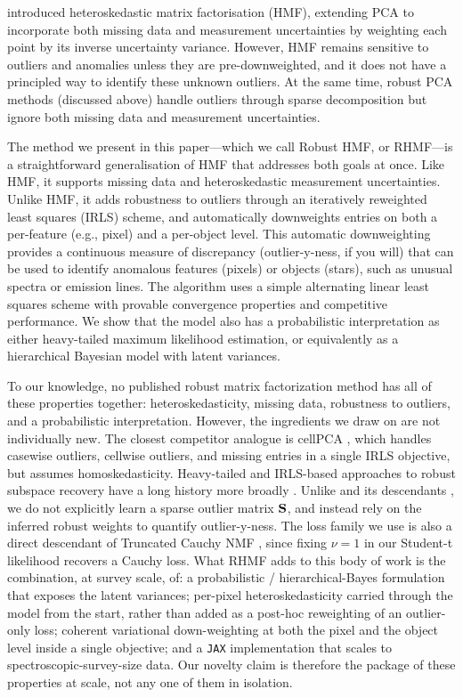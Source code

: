 \documentclass[onecolumn,floatfix,linenumbers,trackchanges]{aastex631}
\begin{document}
\citet{tsalmantza2012} introduced heteroskedastic matrix factorisation (HMF), extending PCA to incorporate both missing data and measurement uncertainties by weighting each point by its inverse uncertainty variance. However, HMF remains sensitive to outliers and anomalies unless they are pre-downweighted, and it does not have a principled way to identify these unknown outliers. At the same time, robust PCA methods (discussed above) handle outliers through sparse decomposition but ignore both missing data and measurement uncertainties.

The method we present in this paper---which we call Robust HMF, or RHMF---is a straightforward generalisation of HMF that addresses both goals at once.
Like HMF, it supports missing data and heteroskedastic measurement uncertainties. Unlike HMF, it adds robustness to outliers through an iteratively reweighted least squares (IRLS) scheme, and automatically downweights entries on both a per-feature (e.g., pixel) and a per-object level.
This automatic downweighting provides a continuous measure of discrepancy (outlier-y-ness, if you will) that can be used to identify anomalous features (pixels) or objects (stars), such as unusual spectra or emission lines.
The algorithm uses a simple alternating linear least squares scheme with provable convergence properties and competitive performance.
We show that the model also has a probabilistic interpretation as either heavy-tailed maximum likelihood estimation, or equivalently as a hierarchical Bayesian model with latent variances.

To our knowledge, no published robust matrix factorization method has all of these properties together: heteroskedasticity, missing data, robustness to outliers, and a probabilistic interpretation.
However, the ingredients we draw on are not individually new. The closest competitor analogue is cellPCA \citep{centofanti2024}, which handles casewise outliers, cellwise outliers, and missing entries in a single IRLS objective, but assumes homoskedasticity.
Heavy-tailed and IRLS-based approaches to robust subspace recovery have a long history more broadly \citep[for reviews see][]{bouwmans2015,polyak2017}. Unlike \citet{candes2011} and its descendants \citep[e.g.,][]{zhou2010,yin2019}, we do not explicitly learn a sparse outlier matrix ${\bf S}$, and instead rely on the inferred robust weights to quantify outlier-y-ness. 
The loss family we use is also a direct descendant of Truncated Cauchy NMF \citep{guan2019}, since fixing $\nu=1$ in our Student-t likelihood recovers a Cauchy loss.
What RHMF adds to this body of work is the combination, at survey scale, of: a probabilistic / hierarchical-Bayes formulation that exposes the latent variances; per-pixel heteroskedasticity carried through the model from the start, rather than added as a post-hoc reweighting of an outlier-only loss; coherent variational down-weighting at both the pixel and the object level inside a single objective; and a \texttt{JAX} implementation that scales to spectroscopic-survey-size data. Our novelty claim is therefore the package of these properties at scale, not any one of them in isolation.
\end{document}
